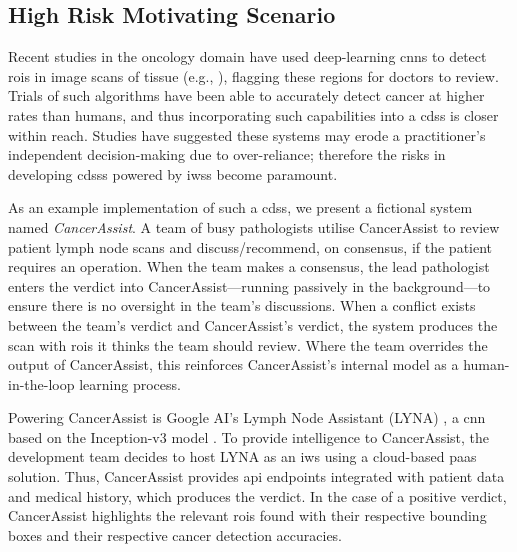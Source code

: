 
\subsection{High Risk Motivating Scenario}
\label{ssec:introduction:motivation:scenario:cancer}

Recent studies in the oncology domain have used deep-learning \glspl{cnn} to detect \glspl{roi} in image scans of tissue (e.g., \citep{Liu:2018fa,Haenssle:2018bz,EhteshamiBejnordi:2017kq}), flagging these regions for doctors to review. Trials of such algorithms have been able to accurately detect cancer at higher rates than humans, and thus incorporating such capabilities into a \gls{cdss} is closer within reach.  Studies have suggested these systems may erode a practitioner's independent decision-making \citep{Jaspers:2011hy,Chambers:1991uh} due to over-reliance; therefore the risks in developing \glspl{cdss} powered by \glspl{iws} become paramount.

As an example implementation of such a \gls{cdss}, we present a fictional system named \textit{CancerAssist}. A team of busy pathologists utilise CancerAssist to review patient lymph node scans and discuss/recommend, on consensus, if the patient requires an operation. When the team makes a consensus, the lead pathologist enters the verdict into CancerAssist---running passively in the background---to ensure there is no oversight in the team's discussions. When a conflict exists between the team's verdict and CancerAssist's verdict, the system produces the scan with \glspl{roi} it thinks the team should review. Where the team overrides the output of CancerAssist, this reinforces CancerAssist's internal model as a human-in-the-loop learning process.


Powering CancerAssist is Google AI's Lymph Node Assistant (LYNA) \citep{Liu:2018fa}, a \gls{cnn} based on the Inception-v3 model \citep{Szegedy:2016ws,Krizhevsky:2012wl}. To provide intelligence to CancerAssist, the development team decides to host LYNA as an \gls{iws} using a cloud-based \gls{paas} solution. Thus, CancerAssist provides \gls{api} endpoints integrated with patient data and medical history, which produces the verdict. In the case of a positive verdict, CancerAssist highlights the relevant \glspl{roi} found with their respective bounding boxes and their respective cancer detection accuracies.

